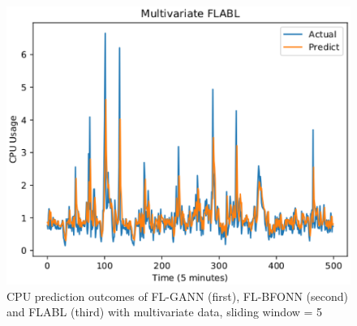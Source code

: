 \documentclass[runningheads]{llncs}
\begin{document}
\begin{figure}[ht]
\begin{minipage}[t]{4cm}
		\includegraphics[width=1\textwidth]{images/pdf/multi_cpu_flabl.eps}
	\end{minipage}
	\caption{CPU prediction outcomes of FL-GANN (first), FL-BFONN (second) and FLABL (third) with multivariate data, sliding window = 5} 
	\label{tn1_half_multi_CPU}
\end{figure}
\end{document}

